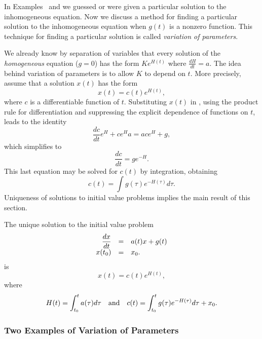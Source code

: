 \documentclass{ximera}
\begin{document}
In Examples~ and  we guessed or were given a
particular solution 
to the inhomogeneous equation.  Now we discuss 
a method for finding a particular solution to the inhomogeneous
equation  when $g(t)$ is a nonzero function.   This 
technique for finding a particular solution is called 
{\em variation of parameters\/}.  

We already know by separation of variables that every solution of the 
{\em homogeneous\/} equation ($g=0$) has the form $Ke^{H(t)}$ where 
$\frac{dH}{dt}=a$.  The idea behind variation of parameters is to
allow $K$ to depend on $t$.    
More precisely, assume that a solution $x(t)$ has the form
\[
x(t) = c(t)e^{H(t)},
\]
where $c$ is a differentiable function of $t$.  Substituting $x(t)$ in 
, using the product rule for differentiation and suppressing
the explicit dependence of functions on $t$, leads to the identity
\[
\frac{dc}{dt}e^{H}+ce^{H}a =  ace^{H}+g,
\]
which simplifies to
\[
\frac{dc}{dt} = ge^{-H}.
\]
This last equation may be solved for $c(t)$ by integration, obtaining
\begin{equation}   \label{eq:c(t)}
c(t) = \int g(\tau)e^{-H(\tau)}d\tau.
\end{equation}
Uniqueness of solutions to initial 
value problems implies the main result of this section.

\begin{thm}  \label{thm:varpar}
The unique solution to the initial value problem
\[
\begin{array}{rcl}
\displaystyle \frac{dx}{dt} & = & a(t)x+g(t) \\
x(t_0) & = & x_0.
\end{array}
\]
is
\[
x(t) = c(t)e^{H(t)},
\]
where 
\[
H(t)=\int_{t_0}^t a(\tau)d\tau \quad\mbox{and}\quad
c(t)=\int_{t_0}^t g(\tau)e^{-H(\tau)}d\tau + x_0.
\]
\end{thm} 


\subsubsection*{Two Examples of Variation of Parameters}
\end{document}
